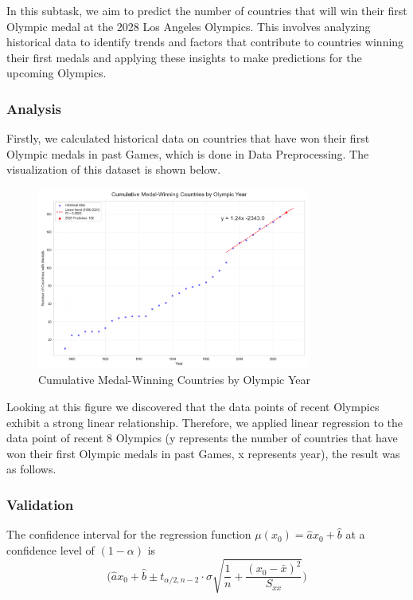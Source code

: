 \documentclass{mcmthesis}
\begin{document}
In this subtask, we aim to predict the number of countries that will win their first Olympic medal at the 2028 Los Angeles Olympics. This involves analyzing historical data to identify trends and factors that contribute to countries winning their first medals and applying these insights to make predictions for the upcoming Olympics.

\subsubsection{Analysis}
Firstly, we calculated historical data on countries that have won their first Olympic medals in past Games, which is done in Data Preprocessing. The visualization of this dataset is shown below.

\begin{figure}[htbp]
    \centering
    \includegraphics[width=0.8\textwidth]{pics/Cumulative Medal-Winning Countries by Olympic Year.png}
    \caption{Cumulative Medal-Winning Countries by Olympic Year}
    \label{fig:cumulative_medal_winning_countries}
\end{figure}


Looking at this figure we discovered that the data points of recent Olympics exhibit a strong linear relationship. Therefore, we applied linear regression to the data point of recent 8 Olympics (y represents the number of countries that have won their first Olympic medals in past Games, x represents year), the result was as follows.

\subsubsection{Validation}
\begin{Theorem}
    The confidence interval for the regression function $\mu (x_0)=\hat{a}x_0+\hat{b}$ at a confidence level of $(1-\alpha)$ is
    $$\bigg( \hat{a}x_0+\hat{b} \pm t_{\alpha /2,n-2}\cdot \sigma \sqrt{\frac{1}{n}+\frac{(x_0-\bar{x})^2}{S_{xx}}} \bigg)$$
\end{Theorem}
\end{document}
